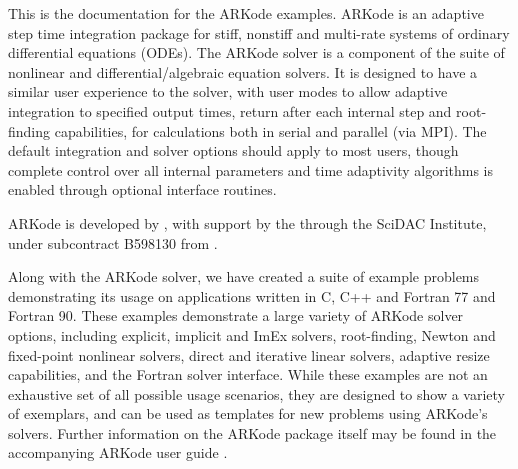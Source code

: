 \documentclass[letterpaper,10pt,english]{sphinxmanual}
\begin{document}
\newpage{\pagestyle{empty}\cleardoublepage}



\sphinxtableofcontents
{}\label{\detokenize{index::doc}}


This is the documentation for the ARKode examples.  ARKode is an
adaptive step time integration package for stiff, nonstiff and
multi-rate systems of ordinary differential equations (ODEs).
The ARKode solver is a component of the  suite of
nonlinear and differential/algebraic equation solvers. It is designed
to have a similar user experience to the 
solver, with user modes to allow adaptive integration to specified
output times, return after each internal step and root-finding
capabilities, for calculations both in serial and parallel (via
MPI). The default integration and solver options should apply to most
users, though complete control over all internal parameters and time
adaptivity algorithms is enabled through optional interface routines.

ARKode is developed by , with support by the  through the  SciDAC Institute, under subcontract
B598130 from .

Along with the ARKode solver, we have created a suite of example
problems demonstrating its usage on applications written in C, C++ and
Fortran 77 and Fortran 90.  These examples demonstrate a large variety
of ARKode solver options, including explicit, implicit and ImEx
solvers, root-finding, Newton and fixed-point nonlinear solvers,
direct and iterative linear solvers, adaptive resize capabilities, and
the Fortran solver interface.  While these examples are not an
exhaustive set of all possible usage scenarios, they are designed to
show a variety of exemplars, and can be used as templates for new
problems using ARKode’s solvers.  Further information on the ARKode
package itself may be found in the accompanying ARKode user guide
\label{\detokenize{index:id1}}{\hyperref[\detokenize{References:r2018}]{\sphinxcrossref{{[}R2018{]}}}}.
\end{document}
